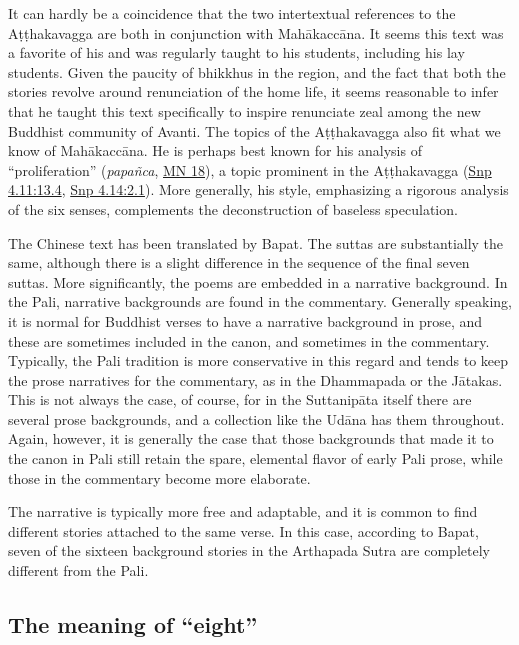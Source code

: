 \documentclass[12pt,openany]{book}%
\begin{document}
It can hardly be a coincidence that the two intertextual references to the \textsanskrit{Aṭṭhakavagga} are both in conjunction with \textsanskrit{Mahākaccāna}. It seems this text was a favorite of his and was regularly taught to his students, including his lay students. Given the paucity of bhikkhus in the region, and the fact that both the stories revolve around renunciation of the home life, it seems reasonable to infer that he taught this text specifically to inspire renunciate zeal among the new Buddhist community of Avanti. The topics of the \textsanskrit{Aṭṭhakavagga} also fit what we know of \textsanskrit{Mahākaccāna}. He is perhaps best known for his analysis of “proliferation” (\textit{\textsanskrit{papañca}}, \href{https://suttacentral.net/mn18/en/sujato}{MN 18}), a topic prominent in the \textsanskrit{Aṭṭhakavagga} (\href{https://suttacentral.net/snp4.11/en/sujato\#13.4}{Snp 4.11:13.4}, \href{https://suttacentral.net/snp4.14/en/sujato\#2.1}{Snp 4.14:2.1}). More generally, his style, emphasizing a rigorous analysis of the six senses, complements the deconstruction of baseless speculation.

The Chinese text has been translated by Bapat. The suttas are substantially the same, although there is a slight difference in the sequence of the final seven suttas. More significantly, the poems are embedded in a narrative background. In the Pali, narrative backgrounds are found in the commentary. Generally speaking, it is normal for Buddhist verses to have a narrative background in prose, and these are sometimes included in the canon, and sometimes in the commentary. Typically, the Pali tradition is more conservative in this regard and tends to keep the prose narratives for the commentary, as in the Dhammapada or the \textsanskrit{Jātakas}. This is not always the case, of course, for in the \textsanskrit{Suttanipāta} itself there are several prose backgrounds, and a collection like the \textsanskrit{Udāna} has them throughout. Again, however, it is generally the case that those backgrounds that made it to the canon in Pali still retain the spare, elemental flavor of early Pali prose, while those in the commentary become more elaborate.

The narrative is typically more free and adaptable, and it is common to find different stories attached to the same verse. In this case, according to Bapat, seven of the sixteen background stories in the Arthapada Sutra are completely different from the Pali.

\subsection*{The meaning of “eight”}
\end{document}
